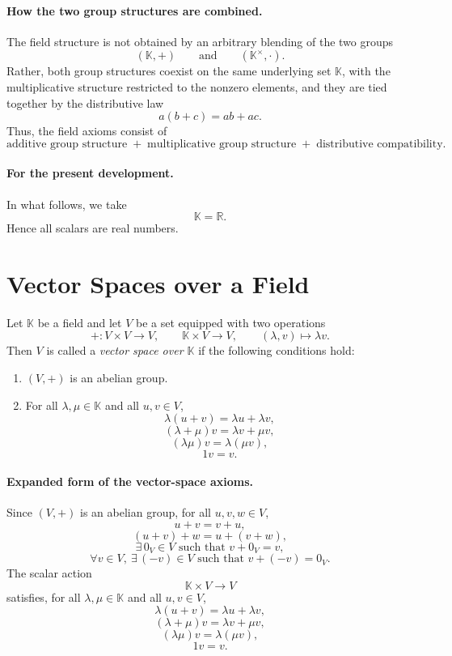 \documentclass{article}
\begin{document}
\paragraph{How the two group structures are combined.}
The field structure is not obtained by an arbitrary blending of the two groups
$$
(\mathbb{K},+)
\qquad\text{and}\qquad
(\mathbb{K}^{\times},\cdot).
$$
Rather, both group structures coexist on the same underlying set $\mathbb{K}$, with the multiplicative structure restricted to the nonzero elements, and they are tied together by the distributive law
$$
a(b+c)=ab+ac.
$$
Thus, the field axioms consist of
$$
\text{additive group structure}
\;+\;
\text{multiplicative group structure}
\;+\;
\text{distributive compatibility}.
$$

\paragraph{For the present development.}
In what follows, we take
$$
\mathbb{K}=\mathbb{R}.
$$
Hence all scalars are real numbers.

\section{Vector Spaces over a Field}

\begin{definition}
Let $\mathbb{K}$ be a field and let $V$ be a set equipped with two operations
$$
+ : V\times V\to V,
\qquad
\mathbb{K}\times V\to V,\qquad (\lambda,v)\mapsto \lambda v.
$$
Then $V$ is called a \emph{vector space over $\mathbb{K}$} if the following conditions hold:
\begin{enumerate}
    \item $(V,+)$ is an abelian group.
    \item For all $\lambda,\mu\in\mathbb{K}$ and all $u,v\in V$,
    $$
    \lambda(u+v)=\lambda u+\lambda v,
    $$
    $$
    (\lambda+\mu)v=\lambda v+\mu v,
    $$
    $$
    (\lambda\mu)v=\lambda(\mu v),
    $$
    $$
    1v=v.
    $$
\end{enumerate}
\end{definition}

\paragraph{Expanded form of the vector-space axioms.}
Since $(V,+)$ is an abelian group, for all $u,v,w\in V$,
$$
u+v=v+u,
$$
$$
(u+v)+w=u+(v+w),
$$
$$
\exists\,0_V\in V\text{ such that }v+0_V=v,
$$
$$
\forall v\in V,\ \exists\,(-v)\in V\text{ such that }v+(-v)=0_V.
$$
The scalar action
$$
\mathbb{K}\times V\to V
$$
satisfies, for all $\lambda,\mu\in\mathbb{K}$ and all $u,v\in V$,
$$
\lambda(u+v)=\lambda u+\lambda v,
$$
$$
(\lambda+\mu)v=\lambda v+\mu v,
$$
$$
(\lambda\mu)v=\lambda(\mu v),
$$
$$
1v=v.
$$
\end{document}

